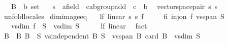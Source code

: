 \begin{isabellebody}
\ \ \ B{}\ {\isacharcolon}{\kern0pt}{\isacharcolon}{\kern0pt}\ {\isachardoublequoteopen}{\isacharprime}{\kern0pt}b\ set{\isachardoublequoteclose}\isanewline
\ \ \ s{}\ {\isacharcolon}{\kern0pt}{\isacharcolon}{\kern0pt}\ {\isachardoublequoteopen}{\isacharprime}{\kern0pt}a{\isacharcolon}{\kern0pt}{\isacharcolon}{\kern0pt}field\ {\isasymRightarrow}\ {\isacharprime}{\kern0pt}c{\isacharcolon}{\kern0pt}{\isacharcolon}{\kern0pt}ab{\isacharunderscore}{\kern0pt}group{\isacharunderscore}{\kern0pt}add\ {\isasymRightarrow}\ {\isacharprime}{\kern0pt}c{\isachardoublequoteclose}\ {\isacharparenleft}{\kern0pt}\ {\isachardoublequoteopen}{\isacharasterisk}{\kern0pt}b{\isachardoublequoteclose}\ {}{}{\isacharparenright}{\kern0pt}\isanewline
{}\isanewline
\isanewline
{}\isamarkupfalse%
\ vector{\isacharunderscore}{\kern0pt}space{\isacharunderscore}{\kern0pt}pair\ s{}\ s{}%
\isadelimproof
\ %
\endisadelimproof
%
\isatagproof
{}\isamarkupfalse%
\ unfold{\isacharunderscore}{\kern0pt}locales%
\endisatagproof
{\isafoldproof}%
%
\isadelimproof
%
\endisadelimproof
\isanewline
\isanewline
{}\isamarkupfalse%
\ dim{\isacharunderscore}{\kern0pt}image{\isacharunderscore}{\kern0pt}eq{\isacharcolon}{\kern0pt}\isanewline
\ \ \ lf{\isacharcolon}{\kern0pt}\ {\isachardoublequoteopen}linear\ s{}\ s{}\ f{\isachardoublequoteclose}\isanewline
\ \ \ \ \ fi{\isacharcolon}{\kern0pt}\ {\isachardoublequoteopen}inj{\isacharunderscore}{\kern0pt}on\ f\ {\isacharparenleft}{\kern0pt}vs{}{\isachardot}{\kern0pt}span\ S{\isacharparenright}{\kern0pt}{\isachardoublequoteclose}\isanewline
\ \ \ {\isachardoublequoteopen}vs{}{\isachardot}{\kern0pt}dim\ {\isacharparenleft}{\kern0pt}f\ {\isacharbackquote}{\kern0pt}\ S{\isacharparenright}{\kern0pt}\ {\isacharequal}{\kern0pt}\ vs{}{\isachardot}{\kern0pt}dim\ S{\isachardoublequoteclose}\isanewline
%
\isadelimproof
%
\endisadelimproof
%
\isatagproof
{}\isamarkupfalse%
\ {\isacharminus}{\kern0pt}\isanewline
\ \ \isamarkupfalse%
\ lf{\isacharcolon}{\kern0pt}\ linear\ \isamarkupfalse%
\ fact\isanewline
\ \ \isamarkupfalse%
\ B\ \ B{\isacharcolon}{\kern0pt}\ {\isachardoublequoteopen}B\ {\isasymsubseteq}\ S{\isachardoublequoteclose}\ {\isachardoublequoteopen}vs{}{\isachardot}{\kern0pt}independent\ B{\isachardoublequoteclose}\ {\isachardoublequoteopen}S\ {\isasymsubseteq}\ vs{}{\isachardot}{\kern0pt}span\ B{\isachardoublequoteclose}\ {\isachardoublequoteopen}card\ B\ {\isacharequal}{\kern0pt}\ vs{}{\isachardot}{\kern0pt}dim\ S{\isachardoublequoteclose}\isanewline

\end{isabellebody}
